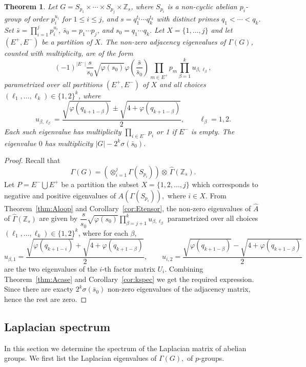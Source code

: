 \documentclass[11pt]{article}
\def \Z {{\mathbb Z}}
\def \Ga {{\Gamma}}
\newtheorem{theorem}{Theorem}[section]
\begin{document}
\begin{theorem}\label{thm:Acase2}
    Let $G = S_{p_1}\times\cdots\times S_{p_j}\times\mathbb{Z}_s$, where 
    $S_{p_i}$ is a non-cyclic abelian $p_i$-group of order $p_i^{u_i}$ 
    for $1\leq i\leq j$, and $s = q_1^{t_1}\cdots q_k^{t_k}$ with 
    distinct primes $q_1 < \cdots < q_k$. Set $\bar{s} = \prod_{i=1}^{j}
    p_i^{u_i}$, $\bar{s}_0 = p_1\cdots p_j$, and $s_0 = q_1\cdots q_k$. 
    Let $X = \{1,\ldots,j\}$ and let $(E^+, E^-)$ be a partition of $X$. 
    The non-zero adjacency eigenvalues of $\Gamma(G)$, counted with 
    multiplicity, are of the form
    $$(-1)^{|E^-|}\frac{s}{s_0}\sqrt{\varphi(s_0)}
    \varphi\!\left(\frac{\bar{s}}{\bar{s}_0}\right)\prod_{m\in E^+}
    p_m\prod_{\beta=1}^{k}u_{\beta,\ell_\beta},$$
    parametrized over all partitions $(E^+,E^-)$ of $X$ and all choices 
    $(\ell_1,\ldots,\ell_k)\in\{1,2\}^k$, where
    $$u_{\beta,\ell_\beta} = \frac{\sqrt{\varphi(q_{k+1-\beta})} \pm 
    \sqrt{4+\varphi(q_{k+1-\beta})}}{2}, \qquad \ell_\beta = 1,2.$$
    Each such eigenvalue has multiplicity $\prod_{i\in E^-}p_i$ or 1 if $E^-$ is empty. The 
    eigenvalue $0$ has multiplicity $|G| - 2^k\sigma(\bar{s}_0)$.
    \end{theorem}
\begin{proof}
Recall that $$\Ga(G)=\left(\otimes_{i=1}^{j}\Ga(S_{p_i})\right)\otimes\, \widehat\Ga(\Z_s).$$ 
Let $P= E^- \bigcup E^+$ be a partition the subset $X=\{1,2,\dots, j\}$ which corresponds to negative and positive eigenvalues of $A(\Ga(S_{p_i})),$ where $i\in X.$ From Theorem~\ref{thm:Aloop} and Corollary~\ref{cor:Etensor}, the non-zero eigenvalues of $\widehat A$ of $\widehat\Ga(\Z_s)$ are given by 
$\dfrac{s}{s_0}\sqrt{\varphi(s_0)} \prod\limits_{\beta=j+1}^{k} u_{\beta,\ell_\beta}$ 
parametrized over all choices $(\ell_1,\ldots,\ell_k)\in\{1,2\}^k$, 
where for each $\beta$,
$$u_{\beta,1} = \frac{\sqrt{\varphi(q_{k+1-i})} + \sqrt{4 + \varphi(q_{k+1-\beta})}}{2}, \qquad u_{i,2} = \frac{\sqrt{\varphi
(q_{k+1-\beta})} - \sqrt{4 + \varphi(q_{k+1-\beta})}}{2}$$
are the two eigenvalues of the $i$-th factor matrix $U_i$. Combining Theorem~\ref{thm:Acase} and Corollary~\ref{cor:kspec} we get the required expression. Since there are exacty $2^k\sigma(\bar s_0)$ non-zero eigenvalues of the adjacency matrix, hence the rest are zero. 
\end{proof}
\subsection{Laplacian spectrum}
In this section we determine the spectrum of the Laplacian matrix of abelian groups. We first list the Laplacian eigenvalues of $\Gamma(G),$ of  $p$-groups.
\end{document}
